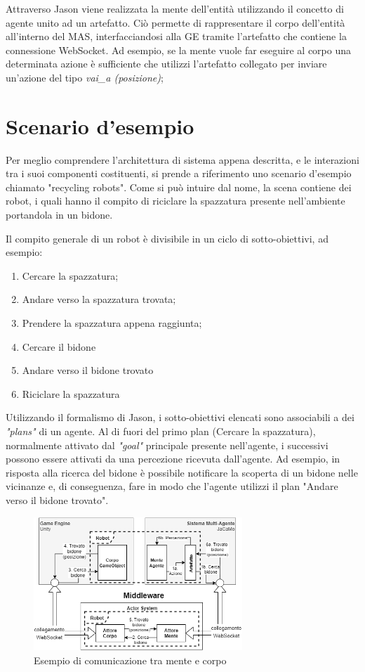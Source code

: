 \medskip

Attraverso Jason viene realizzata la mente dell'entità utilizzando il concetto di agente unito ad un artefatto. Ciò permette di rappresentare il corpo dell'entità all'interno del MAS, interfacciandosi alla GE tramite l'artefatto che contiene la connessione WebSocket. Ad esempio, se la mente vuole far eseguire al corpo una determinata azione è sufficiente che utilizzi l'artefatto collegato per inviare un'azione del tipo \textit{vai\_a (posizione)};

\section{Scenario d'esempio}

Per meglio comprendere l'architettura di sistema appena descritta, e le interazioni tra i suoi componenti costituenti, si prende a riferimento uno scenario d'esempio chiamato "recycling robots". Come si può intuire dal nome, la scena contiene dei robot, i quali hanno il compito di riciclare la spazzatura presente nell'ambiente portandola in un bidone.

\medskip

Il compito generale di un robot è divisibile in un ciclo di sotto-obiettivi, ad esempio:
\begin{enumerate}
    \item Cercare la spazzatura;
    \item Andare verso la spazzatura trovata;
    \item Prendere la spazzatura appena raggiunta;
    \item Cercare il bidone
    \item Andare verso il bidone trovato
    \item Riciclare la spazzatura
\end{enumerate}

Utilizzando il formalismo di Jason, i sotto-obiettivi elencati sono associabili a dei \textit{"plans"} di un agente. Al di fuori del primo plan (Cercare la spazzatura), normalmente attivato dal \textit{"goal"} principale presente nell'agente, i successivi possono essere attivati da una percezione ricevuta dall'agente. Ad esempio, in risposta alla ricerca del bidone è possibile notificare la scoperta di un bidone nelle vicinanze e, di conseguenza, fare in modo che l'agente utilizzi il plan "Andare verso il bidone trovato".

\begin{figure}[H]
\centering
\includegraphics[width=0.7\textwidth]{figures/Esempio.png}
\caption{Esempio di comunicazione tra mente e corpo}
\end{figure}

